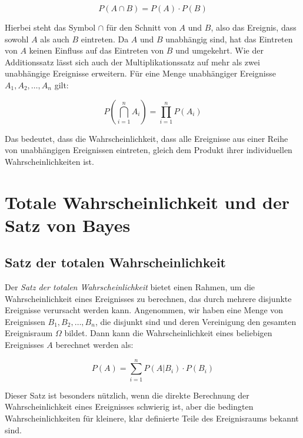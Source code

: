 \begin{equation}
    P(A \cap B) = P(A) \cdot P(B)
\end{equation}

Hierbei steht das Symbol $\cap$ für den Schnitt von $A$ und $B$, also das Ereignis, dass sowohl $A$ als auch $B$ eintreten.
Da $A$ und $B$ unabhängig sind, hat das Eintreten von $A$ keinen Einfluss auf das Eintreten von $B$ und umgekehrt.
\newline \newline
Wie der Additionssatz lässt sich auch der Multiplikationssatz auf mehr als zwei unabhängige Ereignisse erweitern.
Für eine Menge unabhängiger Ereignisse $A_1, A_2, \dots, A_n$ gilt:

\begin{equation}
    P(\bigcap_{i=1}^{n} A_i) = \prod_{i=1}^{n} P(A_i)
\end{equation}

Das bedeutet, dass die Wahrscheinlichkeit, dass alle Ereignisse aus einer Reihe von unabhängigen Ereignissen eintreten, gleich dem Produkt ihrer individuellen Wahrscheinlichkeiten ist.


\section{Totale Wahrscheinlichkeit und der Satz von Bayes}

\subsection{Satz der totalen Wahrscheinlichkeit}

Der \textit{Satz der totalen Wahrscheinlichkeit} bietet einen Rahmen, um die Wahrscheinlichkeit eines Ereignisses zu berechnen, das durch mehrere disjunkte Ereignisse verursacht werden kann.
\newline \newline
Angenommen, wir haben eine Menge von Ereignissen $B_1, B_2, \dots, B_n$, die disjunkt sind und deren Vereinigung den gesamten Ereignisraum $\Omega$ bildet.
Dann kann die Wahrscheinlichkeit eines beliebigen Ereignisses $A$ berechnet werden als:

\begin{equation}
    P(A) = \sum_{i=1}^{n} P(A|B_i) \cdot P(B_i)
\end{equation}

Dieser Satz ist besonders nützlich, wenn die direkte Berechnung der Wahrscheinlichkeit eines Ereignisses schwierig ist, aber die bedingten Wahrscheinlichkeiten für kleinere, klar definierte Teile des Ereignisraums bekannt sind.

